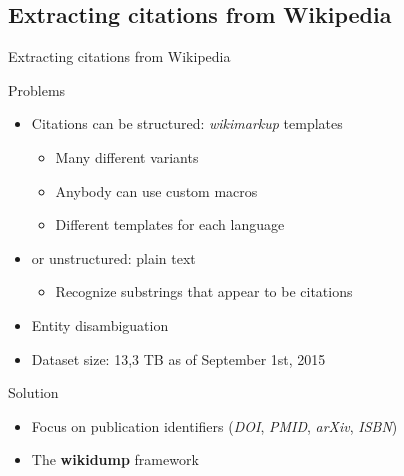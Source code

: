 \documentclass{beamer}
\begin{document}
\subsection{Extracting citations from Wikipedia}
\begin{frame}{Extracting citations from Wikipedia}
    \begin{block}{Problems}
        \begin{itemize}
            \item Citations can be structured: \emph{wikimarkup} templates
            \begin{itemize}
                \item Many different variants
                \item Anybody can use custom macros
                \item Different templates for each language
            \end{itemize}
            \item or unstructured: plain text
            \begin{itemize}
                \item Recognize substrings that appear to be citations
            \end{itemize}
            \item Entity disambiguation
            \item Dataset size: 13,3 TB as of September 1st, 2015
        \end{itemize}
    \end{block}
    \begin{block}{Solution}
        \begin{itemize}
            \item Focus on publication identifiers (\emph{DOI}, \emph{PMID}, \emph{arXiv}, \emph{ISBN})
            \item The \textbf{wikidump} framework
        \end{itemize}
    \end{block}
\end{frame}
\end{document}
